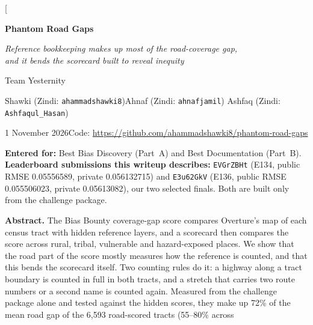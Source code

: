 \documentclass[10pt,twocolumn,a4paper]{article}
\newcommand{\finalAid}{EVGrZBHt}\newcommand{\finalAname}{E134}\newcommand{\finalAscore}{0.05556589}
\newcommand{\finalBid}{E3u62GkV}\newcommand{\finalBname}{E136}\newcommand{\finalBscore}{0.055506023}
\newcommand{\code}[1]{\texttt{\small #1}}
\begin{document}
\twocolumn[{%
\begin{center}
{\fontsize{24}{28}\selectfont\bfseries Phantom Road Gaps\par}
\vspace{5pt}
{\large\itshape Reference bookkeeping makes up most of the road-coverage gap,\\[1pt]
and it bends the scorecard built to reveal inequity\par}
\vspace{8pt}
{\large Team Yesternity\par}
\vspace{2pt}
{\normalsize Shawki (Zindi: \code{ahammadshawki8})\quad\textperiodcentered\quad Ahnaf (Zindi: \code{ahnafjamil})\quad\textperiodcentered\quad
Ashfaq (Zindi: \code{Ashfaqul\_Hasan})\par}
\vspace{3pt}
{\small\color{ink2} 1 November 2026\quad\textperiodcentered\quad Code: \url{https://github.com/ahammadshawki8/phantom-road-gaps}\par}
\end{center}
\vspace{-9pt}
\begin{tcolorbox}[enhanced,colback=accent!6,colframe=accent,boxrule=0.6pt,arc=1.5mm,left=2.5mm,right=2.5mm,top=1.2mm,bottom=1.2mm]
\small\textbf{Entered for:} Best Bias Discovery (Part~A) and Best Documentation (Part~B).\quad
\textbf{Leaderboard submissions this writeup describes:} \code{\finalAid} (\finalAname, public RMSE \finalAscore, private 0.056132715) and
\code{\finalBid} (\finalBname, public RMSE \finalBscore, private 0.05613082), our two selected finals. Both are built only from the challenge package.
\end{tcolorbox}
\vspace{1pt}
\begin{tcolorbox}[enhanced,colback=white,colframe=white,boxrule=0pt,left=6mm,right=6mm,top=0mm,bottom=0mm]
\small\noindent\textbf{Abstract.}
The Bias Bounty coverage-gap score compares Overture's map of each census tract with hidden reference layers, and a
scorecard then compares the score across rural, tribal, vulnerable and hazard-exposed places. We show that the road part
of the score mostly measures how the reference is counted, and that this bends the scorecard itself. Two counting rules
do it: a highway along a tract boundary is counted in full in both tracts, and a
stretch that carries two route numbers or a second name is counted again. Measured from the challenge package alone and
tested against the hidden scores, they make up 72\% of the mean road gap of the 6,593 road-scored tracts (55--80\% across

\end{tcolorbox}}
\end{document}
